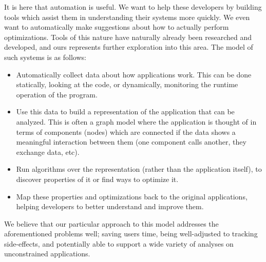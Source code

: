 \documentclass[msc,oneside]{ubcthesis}
\begin{document}
It is here that automation is useful. We want to help these developers by building tools which assist them in understanding their systems more quickly. We even want to automatically make suggestions about how to actually perform optimizations. Tools of this nature have naturally already been researched and developed, and ours represents further exploration into this area. The model of such systems is as follows:\\

\begin{itemize}
\item Automatically collect data about how applications work. This can be done statically, looking at the code, or dynamically, monitoring the runtime operation of the program.
\item Use this data to build a representation of the application that can be analyzed. This is often a graph model where the application is thought of in terms of components (nodes) which are connected if the data shows a meaningful interaction between them (one component calls another, they exchange data, etc).
\item Run algorithms over the representation (rather than the application itself), to discover properties of it or find ways to optimize it.
\item Map these properties and optimizations back to the original applications, helping developers to better understand and improve them.
\end{itemize}

We believe that our particular approach to this model addresses the aforementioned problems well; saving users time, being well-adjusted to tracking side-effects, and potentially able to support a wide variety of analyses on unconstrained applications.

%
%
	
%
\end{document}
